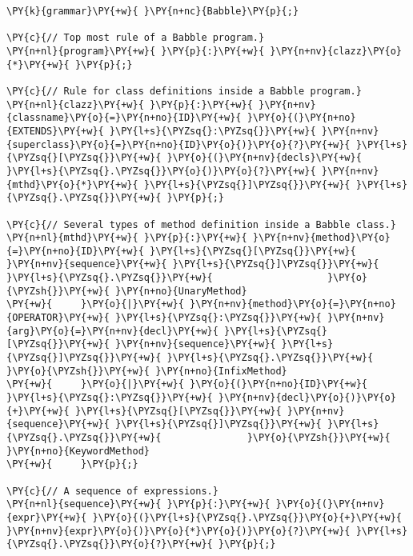 \begin{Verbatim}[commandchars=\\\{\}]
\PY{k}{grammar}\PY{+w}{ }\PY{n+nc}{Babble}\PY{p}{;}

\PY{c}{// Top most rule of a Babble program.}
\PY{n+nl}{program}\PY{+w}{ }\PY{p}{:}\PY{+w}{ }\PY{n+nv}{clazz}\PY{o}{*}\PY{+w}{ }\PY{p}{;}

\PY{c}{// Rule for class definitions inside a Babble program.}
\PY{n+nl}{clazz}\PY{+w}{ }\PY{p}{:}\PY{+w}{ }\PY{n+nv}{classname}\PY{o}{=}\PY{n+no}{ID}\PY{+w}{ }\PY{o}{(}\PY{n+no}{EXTENDS}\PY{+w}{ }\PY{l+s}{\PYZsq{}:\PYZsq{}}\PY{+w}{ }\PY{n+nv}{superclass}\PY{o}{=}\PY{n+no}{ID}\PY{o}{)}\PY{o}{?}\PY{+w}{ }\PY{l+s}{\PYZsq{}[\PYZsq{}}\PY{+w}{ }\PY{o}{(}\PY{n+nv}{decls}\PY{+w}{ }\PY{l+s}{\PYZsq{}.\PYZsq{}}\PY{o}{)}\PY{o}{?}\PY{+w}{ }\PY{n+nv}{mthd}\PY{o}{*}\PY{+w}{ }\PY{l+s}{\PYZsq{}]\PYZsq{}}\PY{+w}{ }\PY{l+s}{\PYZsq{}.\PYZsq{}}\PY{+w}{ }\PY{p}{;}

\PY{c}{// Several types of method definition inside a Babble class.}
\PY{n+nl}{mthd}\PY{+w}{ }\PY{p}{:}\PY{+w}{ }\PY{n+nv}{method}\PY{o}{=}\PY{n+no}{ID}\PY{+w}{ }\PY{l+s}{\PYZsq{}[\PYZsq{}}\PY{+w}{ }\PY{n+nv}{sequence}\PY{+w}{ }\PY{l+s}{\PYZsq{}]\PYZsq{}}\PY{+w}{ }\PY{l+s}{\PYZsq{}.\PYZsq{}}\PY{+w}{                    }\PY{o}{\PYZsh{}}\PY{+w}{ }\PY{n+no}{UnaryMethod}
\PY{+w}{     }\PY{o}{|}\PY{+w}{ }\PY{n+nv}{method}\PY{o}{=}\PY{n+no}{OPERATOR}\PY{+w}{ }\PY{l+s}{\PYZsq{}:\PYZsq{}}\PY{+w}{ }\PY{n+nv}{arg}\PY{o}{=}\PY{n+nv}{decl}\PY{+w}{ }\PY{l+s}{\PYZsq{}[\PYZsq{}}\PY{+w}{ }\PY{n+nv}{sequence}\PY{+w}{ }\PY{l+s}{\PYZsq{}]\PYZsq{}}\PY{+w}{ }\PY{l+s}{\PYZsq{}.\PYZsq{}}\PY{+w}{ }\PY{o}{\PYZsh{}}\PY{+w}{ }\PY{n+no}{InfixMethod}
\PY{+w}{     }\PY{o}{|}\PY{+w}{ }\PY{o}{(}\PY{n+no}{ID}\PY{+w}{ }\PY{l+s}{\PYZsq{}:\PYZsq{}}\PY{+w}{ }\PY{n+nv}{decl}\PY{o}{)}\PY{o}{+}\PY{+w}{ }\PY{l+s}{\PYZsq{}[\PYZsq{}}\PY{+w}{ }\PY{n+nv}{sequence}\PY{+w}{ }\PY{l+s}{\PYZsq{}]\PYZsq{}}\PY{+w}{ }\PY{l+s}{\PYZsq{}.\PYZsq{}}\PY{+w}{               }\PY{o}{\PYZsh{}}\PY{+w}{ }\PY{n+no}{KeywordMethod}
\PY{+w}{     }\PY{p}{;}

\PY{c}{// A sequence of expressions.}
\PY{n+nl}{sequence}\PY{+w}{ }\PY{p}{:}\PY{+w}{ }\PY{o}{(}\PY{n+nv}{expr}\PY{+w}{ }\PY{o}{(}\PY{l+s}{\PYZsq{}.\PYZsq{}}\PY{o}{+}\PY{+w}{ }\PY{n+nv}{expr}\PY{o}{)}\PY{o}{*}\PY{o}{)}\PY{o}{?}\PY{+w}{ }\PY{l+s}{\PYZsq{}.\PYZsq{}}\PY{o}{?}\PY{+w}{ }\PY{p}{;}


\end{Verbatim}
